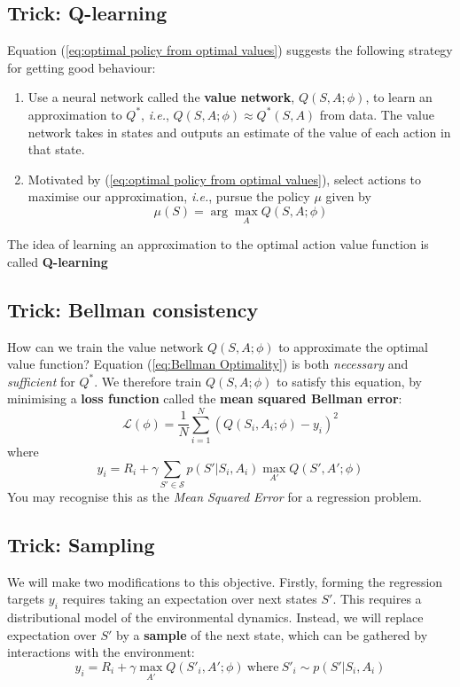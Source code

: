 \documentclass[]{article}
\newcommand{\ie}{\emph{i.e.}}
\begin{document}
\subsection*{Trick: Q-learning}
Equation (\ref{eq:optimal policy from optimal values}) suggests the following strategy for getting good behaviour:
\begin{enumerate}
	\item Use a neural network called the \textbf{value network}, $Q(S,A;\phi)$, to learn an approximation to $Q^*$, \ie, $Q(S,A;\phi) \approx Q^*(S,A)$ from data. The value network takes in states and outputs an estimate of the value of each action in that state. 
	\item Motivated by (\ref{eq:optimal policy from optimal values}), select actions to maximise our approximation, \ie, pursue the policy $\mu$ given by 
	\begin{equation}\label{eq:policy from approximate optimal values}
		\mu(S) = \arg\max_A Q(S,A;\phi)
	\end{equation}
\end{enumerate}
The idea of learning an approximation to the optimal action value function is called \textbf{Q-learning}

\subsection*{Trick: Bellman consistency}
How can we train the value network $Q(S,A;\phi)$ to approximate the optimal value function? Equation (\ref{eq:Bellman Optimality}) is both \emph{necessary} and \emph{sufficient} for $Q^*$. We therefore train $Q(S,A;\phi)$ to satisfy this equation, by minimising a \textbf{loss function} called the \textbf{mean squared Bellman error}:
\begin{equation}\label{eq:loss function}
	\mathcal{L}(\phi) = \frac{1}{N} \sum_{i=1}^N \left( Q(S_i,A_i;\phi) - y_i \right)^2 
\end{equation}
where 
\begin{equation}
	y_i = R_i + \gamma \sum_{S'\in \mathcal{S}} p(S'|S_i,A_i) \max_{A'} Q(S',A';\phi)
\end{equation}
You may recognise this as the \emph{Mean Squared Error} for a regression problem. 

\subsection*{Trick: Sampling}
We will make two modifications to this objective. Firstly, forming the regression targets $y_i$ requires taking an expectation over next states $S'$. This requires a distributional model of the environmental dynamics. Instead, we will replace expectation over $S'$ by a \textbf{sample} of the next state, which can be gathered by interactions with the environment:
\begin{equation}
	y_i = R_i + \gamma \max_{A'} Q(S'_i,A';\phi)~\text{where}~S'_i \sim p(S'|S_i,A_i)
\end{equation}
\end{document}
